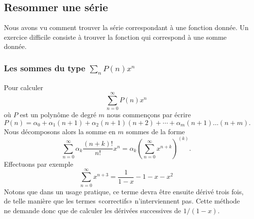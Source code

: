 \subsection{Resommer une série}

Nous avons vu comment trouver la série correspondant à une fonction donnée. Un exercice difficile consiste à trouver la fonction qui correspond à une somme donnée.

\subsubsection{Les sommes du type \texorpdfstring{\(  \sum_nP(n)x^n\)}{P}}

Pour calculer
\begin{equation}
	\sum_{n=0}^{\infty}P(n)x^n
\end{equation}
où \( P\) est un polynôme de degré \( m\) nous commençons par écrire
\begin{equation}
	P(n)=\alpha_0+\alpha_1(n+1)+\alpha_2(n+1)(n+2)+\cdots +\alpha_m(n+1)\ldots (n+m).
\end{equation}
Nous décomposons alors la somme en \( m\) sommes de la forme
\begin{equation}
	\sum_{n=0}^{\infty}\alpha_k\frac{ (n+k)! }{ n! }x^n=\alpha_k\left( \sum_{n=0}^{\infty}x^{n+k} \right)^{(k)}.
\end{equation}
Effectuons par exemple
\begin{equation}
	\sum_{n=0}^{\infty}x^{n+3}=\frac{1}{ 1-x }-1-x-x^2
\end{equation}
Notons que dans un usage pratique, ce terme devra être ensuite dérivé trois fois, de telle manière que les termes «correctifs» n'interviennent pas. Cette méthode ne demande donc que de calculer les dérivées successives de \( 1/(1-x)\).

